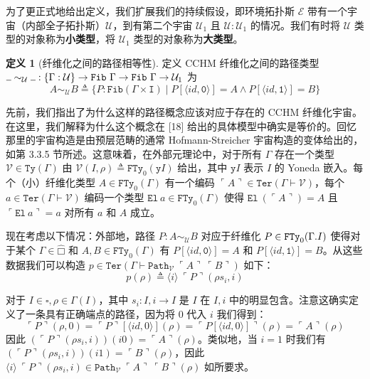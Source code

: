 \documentclass{ctexrep}
\let\mathbb\relax %
\theoremstyle{plain}
\theoremstyle{definition}
\newtheorem{definition}[theorem]{定义}
\theoremstyle{remark}
\newcommand\bbI{\mathbb{I}}
\newcommand\ttI{\mathtt{I}}
\newcommand\hatsquare{\widehat{□}}
\newcommand{\ttzero}{\mathtt{0}}
\newcommand{\ttone}{\mathtt{1}}
\newcommand{\ul}{{\rule[0ex]{0.5em}{0.4pt}}} %
\begin{document}
为了更正式地给出定义，我们扩展我们的持续假设，即环境拓扑斯 $\mathcal{E}$ 带有一个宇宙（内部全子拓扑斯）$\mathcal{U}$，到有第二个宇宙 $\mathcal{U}_1$ 且 $\mathcal{U} : \mathcal{U}_1$ 的情况。我们有时将 $\mathcal{U}$ 类型的对象称为\textbf{小类型}，将 $\mathcal{U}_1$ 类型的对象称为\textbf{大类型}。

\begin{definition}[纤维化之间的路径相等性]
定义 CCHM 纤维化之间的路径类型 $\ul \sim_{\mathcal{U}}\ul  : \{\Gamma : \mathcal{U}\} \to \mathtt{Fib}\ \Gamma \to \mathtt{Fib}\ \Gamma \to \mathcal{U}_1$ 为
\[
A \sim_{\mathcal{U}} B \triangleq \{P : \mathtt{Fib}(\Gamma \times \ttI) \mid P[\langle  id , \ttzero\rangle] = A \land P[\langle  id , \ttone\rangle] = B\}
\]
\end{definition}

先前，我们指出了为什么这样的路径概念应该对应于存在的 CCHM 纤维化宇宙。在这里，我们解释为什么这个概念在 [18] 给出的具体模型中确实是等价的。回忆那里的宇宙构造是由预层范畴的通常 Hofmann-Streicher 宇宙构造的变体给出的，如第 3.3.5 节所述。这意味着，在外部元理论中，对于所有 $\Gamma$ 存在一个类型 $\mathcal{V} \in \mathtt{Ty}(\Gamma)$ 由 $\mathcal{V}(I, \rho) \triangleq \mathtt{FTy}_0(\mathtt{y}I)$ 给出，其中 $\mathtt{y}I$ 表示 $I$ 的 Yoneda 嵌入。每个（小）纤维化类型 $A \in \mathtt{FTy}_0(\Gamma)$ 有一个编码 $\ulcorner A \urcorner \in \mathtt{Ter}(\Gamma \vdash \mathcal{V})$，每个 $a \in \mathtt{Ter}(\Gamma \vdash \mathcal{V})$ 编码一个类型 $\mathtt{El}\ a \in \mathtt{FTy}_0(\Gamma)$ 使得 $\mathtt{El}\ (\ulcorner A \urcorner) = A$ 且 $\ulcorner \mathtt{El}\ a \urcorner = a$ 对所有 $a$ 和 $A$ 成立。

现在考虑以下情况：外部地，路径 $P : A \sim_{\mathcal{U}} B$ 对应于纤维化 $P \in \mathtt{FTy}_0(\Gamma.\bbI)$ 使得对于某个 $\Gamma \in \hatsquare$ 和 $A, B \in \mathtt{FTy}_0(\Gamma)$ 有 $P[\langle  id , \ttzero\rangle] = A$ 和 $P[\langle  id , \ttone\rangle] = B$。从这些数据我们可以构造 $p \in \mathtt{Ter}(\Gamma \vdash \mathtt{Path}_{\mathcal{V}}\ \ulcorner A \urcorner\ \ulcorner B \urcorner)$ 如下：
\[
p(\rho) \triangleq \langle i \rangle\ \ulcorner P \urcorner(\rho s_i, i)
\]

对于 $I \in \square, \rho \in \Gamma(I)$，其中 $s_i : I, i \to I$ 是 $I$ 在 $I, i$ 中的明显包含。注意这确实定义了一条具有正确端点的路径，因为将 $0$ 代入 $i$ 我们得到：
\[
\ulcorner P \urcorner(\rho, 0) = \ulcorner P \urcorner[\langle  id , 0\rangle](\rho) = \ulcorner P[\langle  id , 0\rangle] \urcorner(\rho) = \ulcorner A \urcorner(\rho)
\]
因此 $(\ulcorner P \urcorner(\rho s_i, i))(i0) = \ulcorner A \urcorner(\rho)$。类似地，当 $i = 1$ 时我们有 $(\ulcorner P \urcorner(\rho s_i, i))(i1) = \ulcorner B \urcorner(\rho)$，因此 $\langle i \rangle\ \ulcorner P \urcorner(\rho s_i, i) \in \mathtt{Path}_{\mathcal{V}}\ \ulcorner A \urcorner\ \ulcorner B \urcorner(\rho)$ 如所要求。
\end{document}
